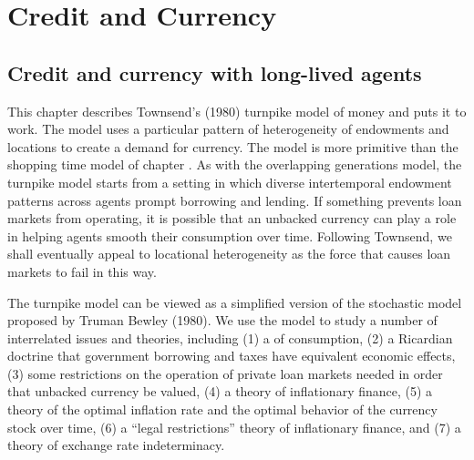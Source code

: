 

%




\def\toone{{t+1}}
\def\ttwo{{t+2}}
\def\tthree{{t+3}}
\def\Tone{{T+1}}
\def\TTT{{T-1}}
\def\rtr{{\rm tr}}
\chapter{Credit and Currency\label{townsend}}
%
\section{Credit and currency with long-lived agents}

This chapter describes Townsend's (1980) turnpike model of money
and puts it to work.  The model uses a particular pattern of heterogeneity
of endowments and locations to create a demand for currency.
The model is more primitive than the shopping time model of chapter
.  As with the overlapping generations model,
the turnpike model starts from a setting in which diverse intertemporal
endowment patterns across agents prompt borrowing and lending.  If
something prevents loan markets from operating, it is possible that
an unbacked currency can play a role in helping agents smooth their
consumption over time.  Following Townsend, we shall eventually appeal
to locational heterogeneity as the force that causes loan markets to
fail in this way.

  
The turnpike  model can be viewed as a simplified version
of the stochastic model proposed by Truman Bewley (1980).   We
use the model to study a number of interrelated issues and theories,
including (1) a  of consumption, (2) a
Ricardian doctrine %
that government borrowing and taxes have
equivalent economic effects, (3) some restrictions on the operation
of private loan markets needed in order that unbacked currency be
valued, (4) a theory of inflationary finance, (5) a theory of
the optimal inflation rate and the optimal behavior of the
currency stock over time, (6) a ``legal restrictions'' theory
of inflationary finance, and (7) a theory of exchange rate
indeterminacy.

